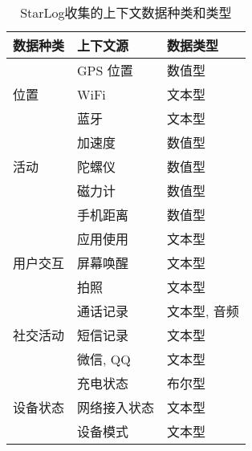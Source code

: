 \begin{center}
\begin{table}[H]
	\wuhao
	\renewcommand{\arraystretch}{1.3}
	\caption{StarLog收集的上下文数据种类和类型}
	\vspace{0.01cm}
	\label{tablesource}
	\centering
	\begin{tabular}{p{4cm} p{4cm} p{4cm}}
   
		\textbf{数据种类} & \textbf{上下文源} & \textbf{数据类型} \\
		\hline
		& GPS 位置 & 数值型\\
		\cline{2-3}
		位置 & WiFi & 文本型\\
		\cline{2-3}
		& 蓝牙 & 文本型 \\
		\hline
		& 加速度 & 数值型\\
		\cline{2-3}
		活动 & 陀螺仪 & 数值型\\
		\cline{2-3}
		& 磁力计 & 数值型 \\
		\cline{2-3}
		& 手机距离 & 数值型 \\
		\hline
		& 应用使用 & 文本型\\
		\cline{2-3}
		用户交互 & 屏幕唤醒 & 文本型\\
		\cline{2-3}
		& 拍照 & 文本型 \\
		\hline
		& 通话记录 & 文本型, 音频\\
		\cline{2-3}
		社交活动 & 短信记录 & 文本型\\
		\cline{2-3}
		& 微信, QQ & 文本型 \\
		\hline
		& 充电状态 & 布尔型\\
		\cline{2-3}
		设备状态 & 网络接入状态 & 文本型\\
		\cline{2-3}
		& 设备模式 & 文本型 \\
		\bottomrule[1.5pt]
	\end{tabular}
\end{table}
\end{center}

